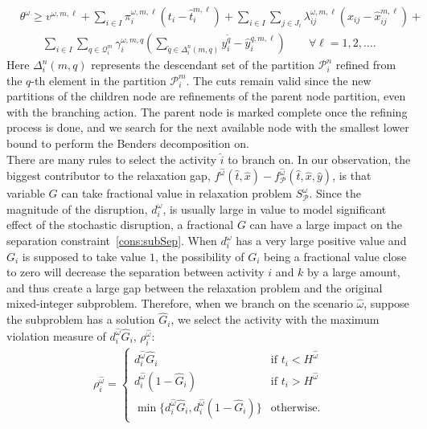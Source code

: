 \documentclass[11pt]{article}
\begin{document}
	\begin{align}\label{cons:updatedcutBB}
	& \theta^\omega \geq v^{\omega,m,\ell} + \sum_{i \in I} \pi_i^{\omega,m,\ell} (t_i - \hat{t}_i^{m,\ell}) + \sum_{i \in I} \sum_{j \in J_i} \lambda_{ij}^{\omega,m,\ell} (x_{ij} - \hat{x}_{ij}^{m,\ell}) + \nonumber \\
	& \qquad \sum_{i \in I} \sum_{q \in \mathcal{Q}^{m}_i} \gamma_{i}^{\omega,m,q} \left( \sum_{\tilde{q} \in \Delta^n_i(m,q)} y_i^{\tilde{q}} - \hat{y}_i^{q,m,\ell} \right) \qquad \forall \ell = 1,2, \dots.
	\end{align}
	Here \(\Delta^n_i(m,q)\) represents the descendant set of the partition \(\mathcal{P}_i^n\) refined from the \(q\)-th element in the partition \(\mathcal{P}_i^m\). The cuts remain valid since the new partitions of the children node are refinements of the parent node partition, even with the branching action. The parent node is marked complete once the refining process is done, and we search for the next available node with the smallest lower bound to perform the Benders decomposition on. \\
	\newline
	There are many rules to select the activity \(\hat{i}\) to branch on. In our observation, the biggest contributor to the relaxation gap, \(f^{\hat{\omega}}(\hat{t},\hat{x}) - f^{\hat{\omega}}_{\mathcal{P}}(\hat{t},\hat{x},\hat{y})\), is that variable \(G\) can take fractional value in relaxation problem \(S_{\mathcal{P}}^\omega\). Since the magnitude of the disruption, \(d_i^\omega\), is usually large in value to model significant effect of the stochastic disruption, a fractional \(G\) can have a large impact on the separation constraint~\eqref{cons:subSep}. When \(d_i^\omega\) has a very large positive value and \(G_i\) is supposed to take value \(1\), the possibility of \(G_i\) being a fractional value close to zero will decrease the separation between activity \(i\) and \(k\) by a large amount, and thus create a large gap between the relaxation problem and the original mixed-integer subproblem. Therefore, when we branch on the scenario \(\hat{\omega}\), suppose the subproblem has a solution \(\hat{G}_i\), we select the activity with the maximum violation measure of \(d_i^{\hat{\omega}} \hat{G}_i\), \(\rho_i^{\hat{\omega}}\):
	\begin{align}
	\rho_i^{\hat{\omega}} = \begin{cases}
	d_i^{\hat{\omega}} \hat{G}_i & \text{if } t_i < H^{\hat{\omega}}\\
	d_i^{\hat{\omega}} (1 - \hat{G}_i) & \text{if } t_i > H^{\hat{\omega}}\\
	\min\{d_i^{\hat{\omega}} \hat{G}_i, d_i^{\hat{\omega}} (1 - \hat{G}_i)\} & \text{otherwise.}
	\end{cases}
	\end{align}
\end{document}

